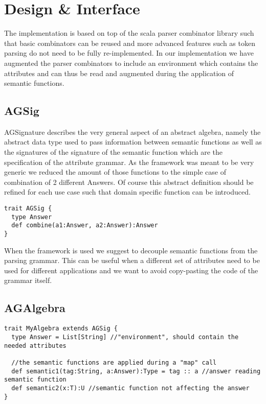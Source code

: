 \section{Design \& Interface}
The implementation is based on top of the scala parser combinator library such that basic combinators can be reused and more advanced features such as token parsing do not need to be fully re-implemented. In our implementation we have augmented the parser combinators to include an environment which contains the attributes and can thus be read and augmented during the application of semantic functions.

\subsection{AGSig}
AGSignature describes the very general aspect of an abstract algebra, namely the abstract data type used to pass information between semantic functions as well as the signatures of the signature of the semantic function which are the specification of the attribute grammar. As the framework was meant to be very generic we reduced the amount of those functions to the simple case of combination of 2 different Answers. Of course this abstract definition should be refined for each use case such that domain specific function can be introduced.
\begin{lstlisting}
trait AGSig {
  type Answer
  def combine(a1:Answer, a2:Answer):Answer
}
\end{lstlisting}

When the framework is used we suggest to decouple semantic functions from the parsing grammar. This can be useful when a different set of attributes need to be used for different applications and we want to avoid copy-pasting the code of the grammar itself. 

\subsection{AGAlgebra}
\begin{lstlisting}
trait MyAlgebra extends AGSig {
  type Answer = List[String] //"environment", should contain the needed attributes

  //the semantic functions are applied during a "map" call
  def semantic1(tag:String, a:Answer):Type = tag :: a //answer reading semantic function
  def semantic2(x:T):U //semantic function not affecting the answer
}
\end{lstlisting}

